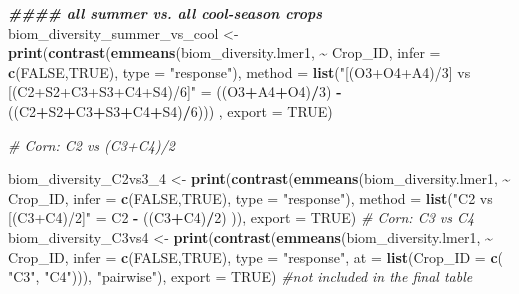 \documentclass[
]{article}
\newenvironment{Shaded}{\begin{snugshade}}{\end{snugshade}}
\newcommand{\AttributeTok}[1]{\textcolor[rgb]{0.13,0.29,0.53}{#1}}
\newcommand{\CommentTok}[1]{\textcolor[rgb]{0.56,0.35,0.01}{\textit{#1}}}
\newcommand{\ConstantTok}[1]{\textcolor[rgb]{0.56,0.35,0.01}{#1}}
\newcommand{\DecValTok}[1]{\textcolor[rgb]{0.00,0.00,0.81}{#1}}
\newcommand{\DocumentationTok}[1]{\textcolor[rgb]{0.56,0.35,0.01}{\textbf{\textit{#1}}}}
\newcommand{\FunctionTok}[1]{\textcolor[rgb]{0.13,0.29,0.53}{\textbf{#1}}}
\newcommand{\NormalTok}[1]{#1}
\newcommand{\OtherTok}[1]{\textcolor[rgb]{0.56,0.35,0.01}{#1}}
\newcommand{\SpecialCharTok}[1]{\textcolor[rgb]{0.81,0.36,0.00}{\textbf{#1}}}
\newcommand{\StringTok}[1]{\textcolor[rgb]{0.31,0.60,0.02}{#1}}
\begin{document}
\begin{Shaded}
\begin{Highlighting}[]
\DocumentationTok{\#\#\#\# all summer vs. all cool{-}season crops }
\NormalTok{biom\_diversity\_summer\_vs\_cool }\OtherTok{\textless{}{-}} \FunctionTok{print}\NormalTok{(}\FunctionTok{contrast}\NormalTok{(}\FunctionTok{emmeans}\NormalTok{(biom\_diversity.lmer1, }\SpecialCharTok{\textasciitilde{}}\NormalTok{ Crop\_ID, }
                                                        \AttributeTok{infer =} \FunctionTok{c}\NormalTok{(}\ConstantTok{FALSE}\NormalTok{,}\ConstantTok{TRUE}\NormalTok{), }
                                                        \AttributeTok{type =} \StringTok{"response"}\NormalTok{),}
                                                \AttributeTok{method =} \FunctionTok{list}\NormalTok{(}\StringTok{"[(O3+O4+A4)/3] vs [(C2+S2+C3+S3+C4+S4)/6]"} \OtherTok{=} 
\NormalTok{                                                                 ((O3}\SpecialCharTok{+}\NormalTok{A4}\SpecialCharTok{+}\NormalTok{O4)}\SpecialCharTok{/}\DecValTok{3}\NormalTok{) }\SpecialCharTok{{-}}\NormalTok{ ((C2}\SpecialCharTok{+}\NormalTok{S2}\SpecialCharTok{+}\NormalTok{C3}\SpecialCharTok{+}\NormalTok{S3}\SpecialCharTok{+}\NormalTok{C4}\SpecialCharTok{+}\NormalTok{S4)}\SpecialCharTok{/}\DecValTok{6}\NormalTok{))) ,}
                                       \AttributeTok{export =} \ConstantTok{TRUE}\NormalTok{)}


\CommentTok{\# Corn: C2 vs (C3+C4)/2 }

\NormalTok{biom\_diversity\_C2vs3\_4 }\OtherTok{\textless{}{-}} \FunctionTok{print}\NormalTok{(}\FunctionTok{contrast}\NormalTok{(}\FunctionTok{emmeans}\NormalTok{(biom\_diversity.lmer1, }\SpecialCharTok{\textasciitilde{}}\NormalTok{ Crop\_ID,}
                                                 \AttributeTok{infer =} \FunctionTok{c}\NormalTok{(}\ConstantTok{FALSE}\NormalTok{,}\ConstantTok{TRUE}\NormalTok{), }
                                                 \AttributeTok{type =} \StringTok{"response"}\NormalTok{),}
                                         \AttributeTok{method =} \FunctionTok{list}\NormalTok{(}\StringTok{"C2 vs [(C3+C4)/2]"} \OtherTok{=}\NormalTok{ C2 }\SpecialCharTok{{-}}\NormalTok{ ((C3}\SpecialCharTok{+}\NormalTok{C4)}\SpecialCharTok{/}\DecValTok{2}\NormalTok{) )),}
                                \AttributeTok{export =} \ConstantTok{TRUE}\NormalTok{)}
\CommentTok{\# Corn: C3 vs C4}
\NormalTok{biom\_diversity\_C3vs4 }\OtherTok{\textless{}{-}} \FunctionTok{print}\NormalTok{(}\FunctionTok{contrast}\NormalTok{(}\FunctionTok{emmeans}\NormalTok{(biom\_diversity.lmer1, }\SpecialCharTok{\textasciitilde{}}\NormalTok{ Crop\_ID,}
                                               \AttributeTok{infer =} \FunctionTok{c}\NormalTok{(}\ConstantTok{FALSE}\NormalTok{,}\ConstantTok{TRUE}\NormalTok{), }
                                               \AttributeTok{type =} \StringTok{"response"}\NormalTok{, }
                                               \AttributeTok{at =} \FunctionTok{list}\NormalTok{(}\AttributeTok{Crop\_ID =} \FunctionTok{c}\NormalTok{( }\StringTok{"C3"}\NormalTok{, }\StringTok{"C4"}\NormalTok{))), }\StringTok{"pairwise"}\NormalTok{),}
                              \AttributeTok{export =} \ConstantTok{TRUE}\NormalTok{) }\CommentTok{\#not included in the final table}


\end{Highlighting}
\end{Shaded}
\end{document}
